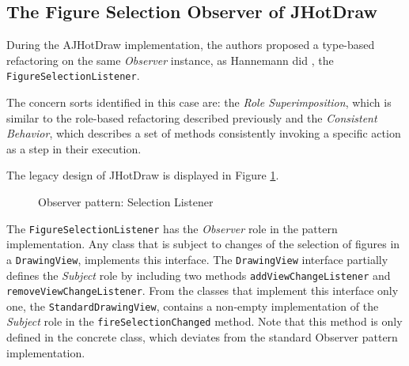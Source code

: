
\subsection{The Figure Selection Observer of JHotDraw}\label{The Figure Selection Observer of JHotDraw}
During the AJHotDraw implementation\cite{marin2005approach}, the authors proposed a type-based refactoring on the same \textit{Observer} instance, as Hannemann did \cite{hannemann2005role}, the \texttt{FigureSelectionListener}.

The concern sorts identified in this case are: the \textit{Role Superimposition}, which is similar to the role-based refactoring described previously and the \textit{Consistent Behavior}, which describes a set of methods consistently invoking a specific action as a step in their execution.

The legacy design of JHotDraw is displayed in Figure \ref{fig:Selection_Listener}.

\begin{figure}[H]
	\centering
  	\caption{Observer pattern: Selection Listener \cite{marin2005approach}}
  	\label{fig:Selection_Listener}
\end{figure}

The \texttt{FigureSelectionListener} has the \textit{Observer} role in the pattern implementation. 
Any class that is subject to changes of the selection of figures in a \texttt{DrawingView}, implements this interface. 
The \texttt{DrawingView} interface partially defines the \textit{Subject} role by including two methods \texttt{addViewChangeListener} and \texttt{removeViewChangeListener}.
From the classes that implement this interface only one, the \texttt{StandardDrawingView}, contains a non-empty implementation of the \textit{Subject} role in the \texttt{fireSelectionChanged} method.
Note that this method is only defined in the concrete class, which deviates from the standard Observer pattern implementation.

